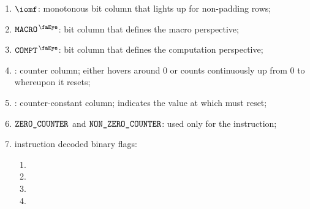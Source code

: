 \begin{enumerate}
    \item
	$\iomf$:
	monotonous bit column that lights up for non-padding rows;
    \item
	$\isRlpUtilsMacro$:
	bit column that defines the macro perspective;
    \item
	$\isRlpUtilsCompt$:
	bit column that defines the computation perspective;
    \item
	\ct{}:
	counter column; 
	either hovers around $0$ or counts continuously up from $0$ to \maxCt{} whereupon it resets;
    \item
	\maxCt:
	counter-constant column;
	indicates the value at which \ct{} must reset;
    \item
	$\texttt{ZERO\_COUNTER}$ and
	$\texttt{NON\_ZERO\_COUNTER}$:
	used only for the  instruction;
    \item
	instruction decoded binary flags:
	\begin{multicols}{2}
	    \begin{enumerate}
		\item \rlpUtilsInstIntegerFlag        {}
		\item \rlpUtilsInstByteStringFlag     {}
		\item \rlpUtilsInstBytesThirtyTwoFlag {}
		\item \rlpUtilsInstDataPricingFlag    {}
	    \end{enumerate}
	\end{multicols}
\end{enumerate}

